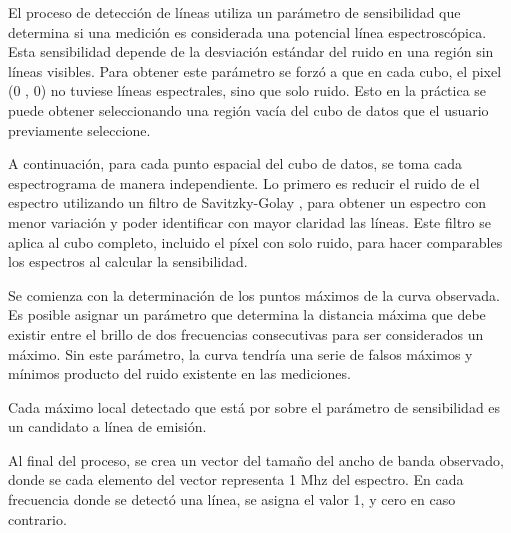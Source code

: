 El proceso de detección de líneas utiliza un parámetro de sensibilidad que determina si una medición es considerada una potencial línea espectroscópica. Esta sensibilidad depende de la desviación estándar del ruido en una región sin líneas visibles. Para obtener este parámetro se forzó a que en cada cubo, el pixel (0 , 0) no tuviese líneas espectrales, sino que solo ruido. Esto en la práctica se puede obtener seleccionando una región vacía del cubo de datos que el usuario previamente seleccione.

A continuación, para cada punto espacial del cubo de datos, se toma cada espectrograma de manera independiente. Lo primero es reducir el ruido de el espectro utilizando un filtro de Savitzky-Golay \cite{howley_effect_2005}, para obtener un espectro con menor variación y poder identificar con mayor claridad las líneas. Este filtro se aplica al cubo completo, incluido el píxel con solo ruido, para hacer comparables los espectros al calcular la sensibilidad.



Se comienza con la determinación de los puntos máximos de la curva observada. Es posible asignar un parámetro que determina la distancia máxima que debe existir entre el brillo de dos frecuencias consecutivas para ser considerados un máximo. Sin este parámetro, la curva tendría una serie de falsos máximos y mínimos producto del ruido existente en las mediciones.

Cada máximo local detectado que está por sobre el parámetro de sensibilidad es un candidato a línea de emisión.


Al final del proceso, se crea un vector del tamaño del ancho de banda observado, donde se cada elemento del vector representa 1 Mhz del espectro. En cada frecuencia donde se detectó una línea, se asigna el valor 1, y cero en caso contrario.


